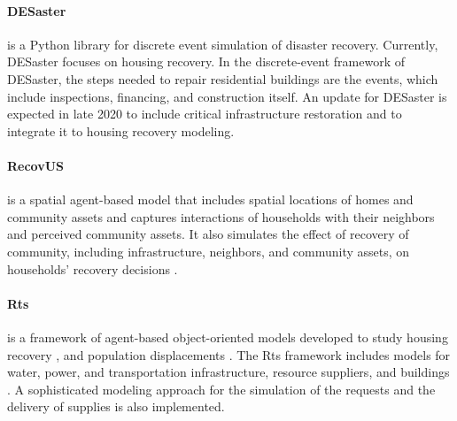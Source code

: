 \paragraph{DESaster} 
 is a Python library for discrete event simulation of disaster recovery. Currently, DESaster focuses on housing recovery. In the discrete-event framework of DESaster, the steps needed to repair residential buildings are the events, which include inspections, financing, and construction itself. An update for DESaster is expected in late 2020 to include critical infrastructure restoration and to integrate it to housing recovery modeling.

\paragraph{RecovUS}  is a spatial agent-based model that includes spatial locations of homes and community assets and captures interactions of households with their neighbors and perceived community assets. It also simulates the effect of recovery of community, including infrastructure, neighbors, and community assets, on households' recovery decisions \citep{moradi2020recovus}. 

\paragraph{Rts}  is a framework of agent-based object-oriented models developed to study housing recovery \citep{costa2020housing}, and population displacements \citep{costa2020predicting}. The Rts framework includes models for water, power, and transportation infrastructure, resource suppliers, and buildings \citep{Costa2019thesis}. A sophisticated modeling approach for the simulation of the requests and the delivery of supplies is also implemented.

